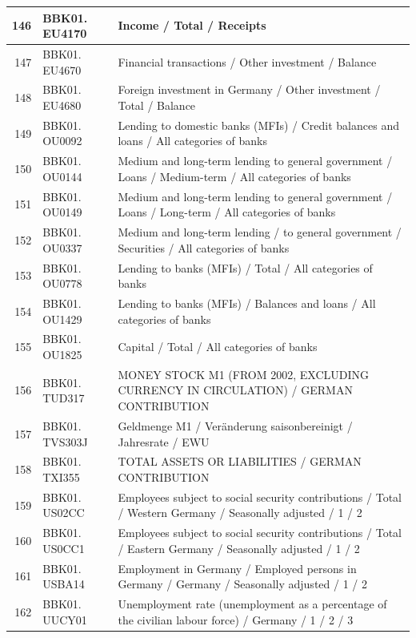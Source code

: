 \documentclass[12pt]{article}
\begin{document}
\begin{table}[ht]
\centering
\begin{tabular}{r|p{4cm}p{11cm}}
	\hline
	146 & BBK01. EU4170 & Income / Total / Receipts \\ 
	\hline
	147 & BBK01. EU4670 & Financial transactions / Other investment / Balance \\ 
	\hline
	148 & BBK01. EU4680 & Foreign investment in Germany / Other investment / Total / Balance \\ 
	\hline
	149 & BBK01. OU0092 & Lending to domestic banks (MFIs) / Credit balances and loans / All categories of banks \\ 
	\hline
	150 & BBK01. OU0144 & Medium and long-term lending to general government / Loans / Medium-term / All categories of banks \\ 
	\hline
	151 & BBK01. OU0149 & Medium and long-term lending to general government / Loans / Long-term / All categories of banks \\ 
	\hline
	152 & BBK01. OU0337 & Medium and long-term lending / to general government / Securities / All categories of banks \\ 
	\hline
	153 & BBK01. OU0778 & Lending to banks (MFIs) / Total / All categories of banks \\ 
	\hline
	154 & BBK01. OU1429 & Lending to banks (MFIs) / Balances and loans / All categories of banks \\ 
	\hline
	155 & BBK01. OU1825 & Capital / Total / All categories of banks \\ 
	\hline
	156 & BBK01. TUD317 & MONEY STOCK M1 (FROM 2002, EXCLUDING CURRENCY IN CIRCULATION) / GERMAN CONTRIBUTION 
	\\ 
	\hline
	157 & BBK01. TVS303J & Geldmenge M1 /                                                   Veränderung saisonbereinigt / Jahresrate / EWU \\ 
	\hline
	158 & BBK01. TXI355 & TOTAL ASSETS OR LIABILITIES / GERMAN CONTRIBUTION \\ 
	\hline
	159 & BBK01. US02CC & Employees subject to social security contributions / Total / Western Germany / Seasonally adjusted / 1 / 2 \\ 
	\hline
	160 & BBK01. US0CC1 & Employees subject to social security contributions / Total / Eastern Germany / Seasonally adjusted / 1 / 2 \\ 
	\hline
	161 & BBK01. USBA14 & Employment in Germany / Employed persons in Germany / Germany / Seasonally adjusted / 1 / 2 \\ 
	\hline
	162 & BBK01. UUCY01 & Unemployment rate (unemployment as a percentage of the civilian labour force) / Germany / 1 / 2 / 3 \\ 

\end{tabular}
\end{table}
\end{document}
